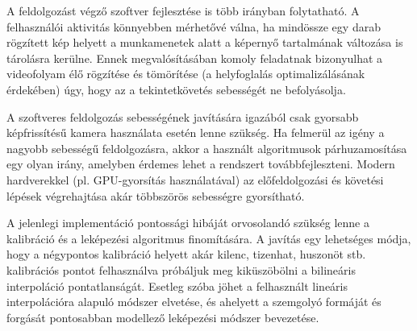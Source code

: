 \bigskip

A feldolgozást végző szoftver fejlesztése is több irányban folytatható. A felhasználói aktivitás könnyebben mérhetővé válna, ha mindössze egy darab rögzített kép helyett a munkamenetek alatt a képernyő tartalmának változása is tárolásra kerülne. Ennek megvalósításában komoly feladatnak bizonyulhat a videofolyam élő rögzítése és tömörítése (a helyfoglalás optimalizálásának érdekében) úgy, hogy az a tekintetkövetés sebességét ne befolyásolja.

A szoftveres feldolgozás sebességének javítására igazából csak gyorsabb képfrissítésű kamera használata esetén lenne szükség. Ha felmerül az igény a nagyobb sebességű feldolgozásra, akkor a használt algoritmusok párhuzamosítása egy olyan irány, amelyben érdemes lehet a rendszert továbbfejleszteni. Modern hardverekkel (pl. GPU-gyorsítás használatával) az előfeldolgozási és követési lépések végrehajtása akár többszörös sebességre gyorsítható.

A jelenlegi implementáció pontossági hibáját orvosolandó szükség lenne a kalibráció és a leképezési algoritmus finomítására. A javítás egy lehetséges módja, hogy a négypontos kalibráció helyett akár kilenc, tizenhat, huszonöt stb. kalibrációs pontot felhasználva próbáljuk meg kiküszöbölni a bilineáris interpoláció pontatlanságát. Esetleg szóba jöhet a felhasznált lineáris interpolációra alapuló módszer elvetése, és ahelyett a szemgolyó formáját és forgását pontosabban modellező leképezési módszer bevezetése.